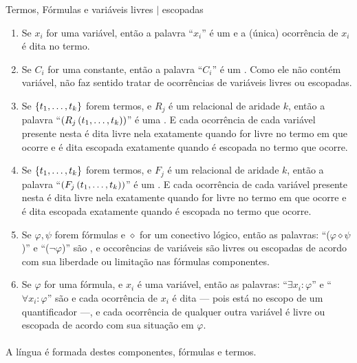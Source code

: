     \begin{definition}{Termos, Fórmulas e variáveis livres ${\vert}$ escopadas}
        \begin{enumerate}[label=(\alph*)]
            \item Se $x_i$ for uma variável, então a palavra ``$x_i$'' é um 
                 e a (única) ocorrência de $x_i$ é dita 
                 no termo.

            \item Se $C_i$ for uma constante, então a palavra ``$C_i$'' é 
                um . Como ele não contém variável, não faz 
                sentido tratar de ocorrências de variáveis livres ou escopadas.

            \item Se $\SET{t_1}{\ldots}{t_k}$ forem termos, e $R_j$ é um 
                relacional de aridade $k$, então a palavra 
                ``$(R_j\POINT{t_1}{\ldots}{t_k})$'' é uma . E 
                cada ocorrência de cada variável presente nesta é dita livre 
                nela exatamente quando for livre no termo em que ocorre e 
                é dita escopada exatamente quando é escopada no termo que 
                ocorre.
        
            \item Se $\SET{t_1}{\ldots}{t_k}$ forem termos, e $F_j$ é um 
                relacional de aridade $k$, então a palavra 
                ``$(F_j\POINT{t_1}{\ldots}{t_k})$'' é um . E 
                cada ocorrência de cada variável presente nesta é dita livre 
                nela exatamente quando for livre no termo em que ocorre e 
                é dita escopada exatamente quando é escopada no termo que 
                ocorre.

            \item Se $\varphi,\psi$ forem fórmulas e $\diamond$ for um conectivo 
                lógico, então as palavras: ``($\varphi\diamond\psi$)'' e ``($\neg\varphi$)''
                são , e occorências de variáveis são livres ou escopadas 
                de acordo com sua liberdade ou limitação nas fórmulas componentes.
            
            \item Se $\varphi$ for uma fórmula, e $x_i$ é uma variável, então as 
                palavras: ``$\exists x_i:\varphi$'' e ``$\forall x_i:\varphi$''
                são  e cada ocorrência de $x_i$ é dita 
                --- pois está no escopo de um quantificador ---,
                e cada ocorrência de qualquer outra variável é livre ou escopada 
                de acordo com sua situação em $\varphi$.
        \end{enumerate}
        \paragraph{}
            A língua é formada destes componentes, fórmulas e termos.
    \end{definition}
    
